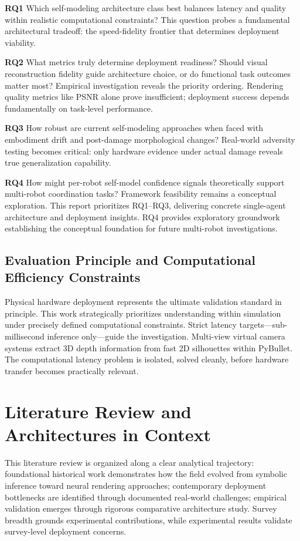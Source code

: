 ﻿\documentclass[11pt,a4paper]{article}
\begin{document}
\textbf{RQ1} Which self-modeling architecture class best balances latency and quality within realistic computational constraints? This question probes a fundamental architectural tradeoff: the speed-fidelity frontier that determines deployment viability.

\textbf{RQ2} What metrics truly determine deployment readiness? Should visual reconstruction fidelity guide architecture choice, or do functional task outcomes matter most? Empirical investigation reveals the priority ordering. Rendering quality metrics like PSNR alone prove insufficient; deployment success depends fundamentally on task-level performance.

\textbf{RQ3} How robust are current self-modeling approaches when faced with embodiment drift and post-damage morphological changes? Real-world adversity testing becomes critical: only hardware evidence under actual damage reveals true generalization capability.

\textbf{RQ4} How might per-robot self-model confidence signals theoretically support multi-robot coordination tasks? Framework feasibility remains a conceptual exploration. This report prioritizes RQ1--RQ3, delivering concrete single-agent architecture and deployment insights. RQ4 provides exploratory groundwork establishing the conceptual foundation for future multi-robot investigations.

\subsection{Evaluation Principle and Computational Efficiency Constraints}

Physical hardware deployment represents the ultimate validation standard in principle. This work strategically prioritizes understanding within simulation under precisely defined computational constraints. Strict latency targets—sub-millisecond inference only—guide the investigation. Multi-view virtual camera systems extract 3D depth information from fast 2D silhouettes within PyBullet. The computational latency problem is isolated, solved cleanly, before hardware transfer becomes practically relevant.

\section{Literature Review and Architectures in Context}
This literature review is organized along a clear analytical trajectory: foundational historical work demonstrates how the field evolved from symbolic inference toward neural rendering approaches; contemporary deployment bottlenecks are identified through documented real-world challenges; empirical validation emerges through rigorous comparative architecture study. Survey breadth grounds experimental contributions, while experimental results validate survey-level deployment concerns.
\end{document}

